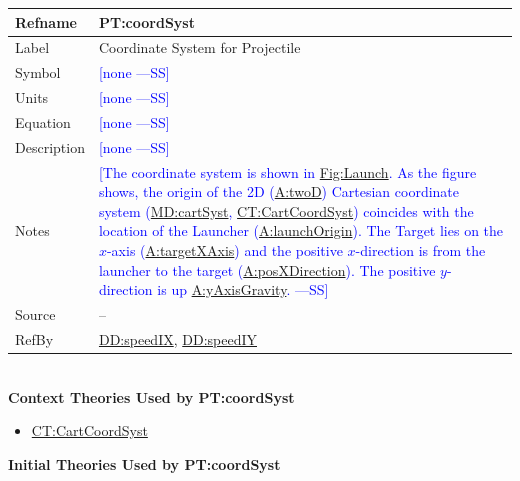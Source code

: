 \documentclass[12pt]{article}
\newcommand{\authornote}[3]{\textcolor{#1}{[#3 ---#2]}}
\newcommand{\authornote}[3]{}
\newcommand{\wss}[1]{\authornote{blue}{SS}{#1}}
\begin{document}
\medskip
\noindent
\begin{minipage}{\textwidth}
\begin{tabular}{>{\raggedright}p{}>{\raggedright\arraybackslash}p{}}
\toprule \textbf{Refname} & \textbf{PT:coordSyst}
\label{PT:coordSyst}
\\ \midrule
Label & Coordinate System for Projectile
        
\\ \midrule
Symbol & \wss{none}
         
\\ \midrule
Units & \wss{none}
        
\\ \midrule
Equation & \wss{none}

\\ \midrule
Description & \wss{none}

\\ \midrule Notes & \wss{The coordinate system is shown in
\hyperref[Figure:Launch]{Fig:Launch}.  As the figure shows, the origin of the 2D
(\hyperref[twoD]{A:twoD}) Cartesian coordinate system
(\hyperref[MD:cartSyst]{MD:cartSyst}, \hyperref[CT:CartCoordSyst]{CT:CartCoordSyst})
coincides with the location of the Launcher
(\hyperref[launchOrigin]{A:launchOrigin}). The Target lies on the $x$-axis
(\hyperref[targetXAxis]{A:targetXAxis}) and the positive $x$-direction is from the
launcher to the target (\hyperref[posXDirection]{A:posXDirection}).  The positive
$y$-direction is up \hyperref[yAxisGravity]{A:yAxisGravity}.}
        
\\ \midrule
Source & --
         
\\ \midrule
RefBy & \hyperref[DD:speedIX]{DD:speedIX}, \hyperref[DD:speedIY]{DD:speedIY}
        
\\ \bottomrule
\end{tabular}
\end{minipage}
~\\

\noindent \textbf{Context Theories Used by PT:coordSyst}

\begin{itemize}
\item \hyperref[CT:CartCoordSyst]{CT:CartCoordSyst}
\end{itemize}

\noindent \textbf{Initial Theories Used by PT:coordSyst}
\end{document}
